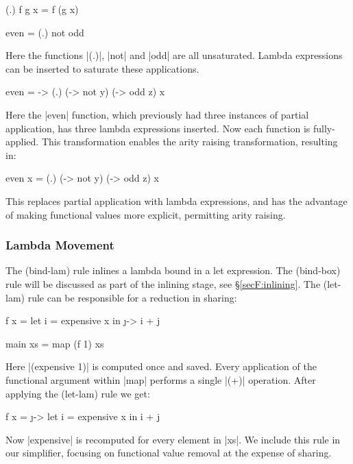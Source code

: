 \begin{example}
\ignore\begin{code}
(.) f g x = f (g x)

even = (.) not odd
\end{code}

\noindent Here the functions |(.)|, |not| and |odd| are all unsaturated. Lambda expressions can be inserted to saturate these applications.

\begin{code}
even = \x -> (.) (\y -> not y) (\z -> odd z) x
\end{code}

\noindent Here the |even| function, which previously had three instances of partial application, has three lambda expressions inserted. Now each function is fully-applied. This transformation enables the arity raising transformation, resulting in:

\begin{code}
even x = (.) (\y -> not y) (\z -> odd z) x
\end{code}
\end{example}

This replaces partial application with lambda expressions, and has the advantage of making functional values more explicit, permitting arity raising.

\subsubsection{Lambda Movement}
\label{secF:sharing}

The (bind-lam) rule inlines a lambda bound in a let expression. The (bind-box) rule will be discussed as part of the inlining stage, see \S\ref{secF:inlining}. The (let-lam) rule can be responsible for a reduction in sharing:

\begin{example}
\begin{code}
f x =  let  i = expensive x
       in   \j -> i + j

main xs = map (f 1) xs
\end{code}

Here |(expensive 1)| is computed once and saved. Every application of the functional argument within |map| performs a single |(+)| operation. After applying the (let-lam) rule we get:

\begin{code}
f x =  \j ->  let  i = expensive x
              in   i + j
\end{code}

Now |expensive| is recomputed for every element in |xs|. We include this rule in our simplifier, focusing on functional value removal at the expense of sharing.
\end{example}


